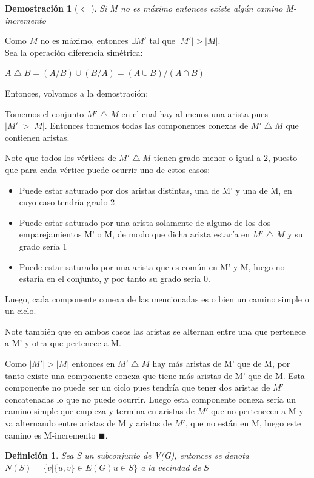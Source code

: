 \documentclass[a4paper,1pt]{report}
\newtheorem*{dem}{Demostración}
\newtheorem*{dfn}{Definición}
\begin{document}
\begin{dem}[$\Leftarrow$]
    Si M no es máximo entonces existe algún camino M-incremento
\end{dem}

Como $M$ no es m\'aximo, entonces $\exists M'$ tal que $|M'| > |M|$.\\

Sea la operación diferencia simétrica:

$A\bigtriangleup B = (A/B) \cup (B/A) = (A\cup B) / (A\cap B)$

Entonces, volvamos a la demostración:

Tomemos el conjunto $M'\bigtriangleup M$ en el cual hay al menos una arista pues \\
$|M'|>|M|$. Entonces tomemos todas las componentes conexas de $M'\bigtriangleup M$ que contienen aristas. 

Note que todos los vértices de $M'\bigtriangleup M$ tienen grado menor o igual a 2, puesto que para cada v\'ertice puede ocurrir uno de estos casos:
\begin{itemize}
 \item Puede estar saturado por dos aristas distintas, una de M' y una de M, en cuyo caso tendría grado 2
 \item Puede estar saturado por una arista solamente de alguno de los dos emparejamientos M' o M, de modo que dicha arista estaría en $M'\bigtriangleup M$ y su grado sería 1
 \item Puede estar saturado por una arista que es común en M' y M, luego no estaría en el conjunto, y por tanto su grado sería 0.
\end{itemize}

Luego, cada componente conexa de las mencionadas es o bien un camino simple o un ciclo. 

Note también que en ambos casos las aristas se alternan entre una que pertenece a M' y otra que pertenece a M.

Como $|M'|>|M|$ entonces en $M'\bigtriangleup M$ hay más aristas de M' que de M, por tanto existe una componente conexa que tiene más aristas de M' que de M. Esta componente no puede ser un ciclo pues tendría que tener dos aristas de $M'$ concatenadas lo que no puede ocurrir. Luego esta componente conexa sería un camino simple que empieza y termina en aristas de $M'$ que no pertenecen a M y va alternando entre aristas de M y aristas de $M'$, que no están en M, luego este camino es M-incremento $\blacksquare$.

\begin{dfn}
 Sea S un subconjunto de V(G), entonces se denota $N(S)=\{v|\{u,v\} \in E(G) u\in S\}$ a la vecindad de $S$
\end{dfn}
\end{document}
